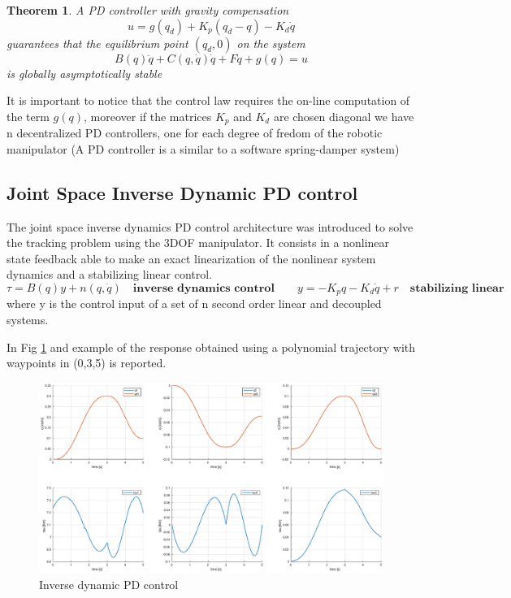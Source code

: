\documentclass[a4paper,12pt]{article}
\newtheorem{theorem}{Theorem}
\begin{document}
\begin{theorem}
A PD controller with gravity compensation
\[
    u = g(q_{d}) + K_p(q_d -q) - K_d\dot{q}
\]
guarantees that the equilibrium point $(q_d, 0)$ on the system 
\[
    B(q)\ddot{q} + C(q,\dot{q}) \dot{q} + F\dot{q} + g(q) = u
\]
is globally asymptotically stable
\end{theorem}

It is important to notice that the control law requires the on-line computation of the term $g(q)$, moreover if the matrices $K_p$ and $K_d$ are chosen diagonal we have n decentralized PD controllers, one for each degree of fredom of the robotic manipulator (A PD controller is a similar to a software spring-damper system)

\newpage 
\subsection{Joint Space Inverse Dynamic PD control}

The joint space inverse dynamics PD control architecture was introduced to solve the tracking problem using the 3DOF manipulator. It consists in a  nonlinear state feedback able to make an exact linearization of the nonlinear system dynamics and a stabilizing linear control. 
\[
    \tau = B(q)y + n(q, \dot{q}) \quad \textbf{inverse dynamics control}
    \qquad
    y = -K_{p}q - K_{d}\dot{q} + r \quad \textbf{stabilizing linear}
\]
where y is the control input of a set of n second order linear and decoupled systems.

In Fig \ref{fig:inv_dyn} and example of the response obtained using a polynomial trajectory with waypoints in (0,3,5) is reported.
\begin{figure}[H]
    \begin{center}
        \hspace*{-4.5cm}
        \includegraphics[scale=0.5]{images/inv_dyn.eps}
    \end{center}
    \caption{Inverse dynamic PD control}
    \label{fig:inv_dyn}
\end{figure}
\end{document}
